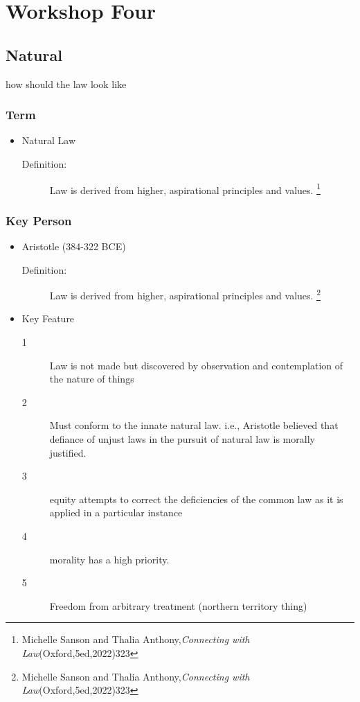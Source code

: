 \section*{Workshop Four}
\date{March 26th 2024}

\subsection*{Natural}
how should the law look like
\subsubsection*{Term}
\begin{itemize}
    \item Natural Law
        \begin{description}
            \item[Definition:] Law is derived from higher, aspirational principles and values. \footnote{Michelle Sanson and Thalia Anthony,\textit{Connecting with Law}(Oxford,5ed,2022)323}
        \end{description}

\end{itemize}

\subsubsection*{Key Person}
\begin{itemize}
    \item Aristotle (384-322 BCE)
        \begin{description}
            \item[Definition:] Law is derived from higher, aspirational principles and values. \footnote{Michelle Sanson and Thalia Anthony,\textit{Connecting with Law}(Oxford,5ed,2022)323}
        \end{description}
    \item Key Feature
        \begin{description}
            \item[1]Law is not made but discovered by observation and contemplation of the nature of things
            \item[2] Must conform to the innate natural law. i.e., Aristotle believed that defiance of unjust laws in the pursuit of natural law is morally justified.
            \item[3] equity attempts to correct the deficiencies of the common law as it is applied in a particular instance
            \item[4] morality has a high priority. 
            \item[5] Freedom from arbitrary treatment (northern territory thing)
        \end{description}
\end{itemize}

